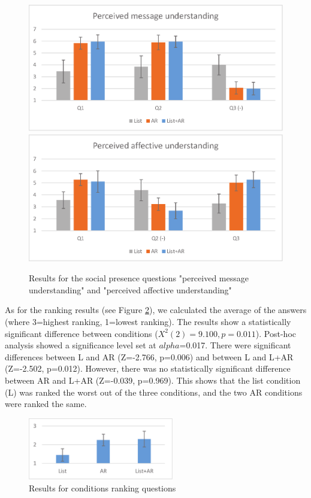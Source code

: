 \begin{figure}[ht]
  \centering
  \includegraphics[width=.8\linewidth]{images/mgia16/message.eps}
  \includegraphics[width=.8\linewidth]{images/mgia16/affective.eps}
  \caption{Results for the social presence questions "perceived message understanding" and "perceived affective understanding"}
	\label{fig:mgia16:social_presence}
\end{figure}

As for the ranking results (see Figure \ref{fig:mgia16:ranking}), we calculated the average of the answers (where 3=highest ranking, 1=lowest ranking). The results show a statistically significant difference between conditions ($X^2(2)=9.100, p=0.011$). Post-hoc analysis showed a significance level set at $alpha$=0.017. There were significant differences between L and AR (Z=-2.766, p=0.006) and between L and L+AR (Z=-2.502, p=0.012). However, there was no statistically significant difference between AR and L+AR (Z=-0.039, p=0.969). This shows that the list condition (L) was ranked the worst out of the three conditions, and the two AR conditions were ranked the same.

\begin{figure}[ht]
  \centering
  \includegraphics[width=2.5in]{images/mgia16/ranking.eps}
  \caption{Results for conditions ranking questions}
	\label{fig:mgia16:ranking}
\end{figure}

